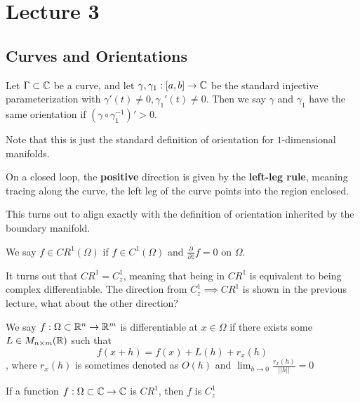 \section{Lecture 3}

\subsection{Curves and Orientations}

\begin{definition}
Let $\Gamma \subset \mathbb{C}$ be a curve, and let $\gamma, \gamma_1: [a, b] \to \mathbb{C}$ be the standard injective parameterization with $\gamma'(t) \neq 0, \gamma_1'(t) \neq 0$. Then we say $\gamma$ and $\gamma_1$ have the same orientation if $(\gamma \circ \gamma_1^{-1})' > 0$.
\end{definition}

Note that this is just the standard definition of orientation for $1$-dimensional manifolds.

On a closed loop, the \textbf{positive} direction is given by the \textbf{left-leg rule}, meaning tracing along the curve, the left leg of the curve points into the region enclosed.

This turns out to align exactly with the definition of orientation inherited by the boundary manifold.

\begin{definition}
We say $f \in CR^1(\Omega)$ if $f \in C^1(\Omega)$ and $\frac{\partial}{\partial \overline{z}} f = 0$ on $\Omega$.
\end{definition}

\begin{remark}
    It turns out that $CR^1 = C^1_z$, meaning that being in $CR^1$ is equivalent to being complex differentiable. The direction from $C^1_z \implies CR^1$ is shown in the previous lecture, what about the other direction?
\end{remark}

\begin{definition}
We say $f: \Omega \subset \mathbb{R}^n \to \mathbb{R}^m$ is differentiable at $x \in \Omega$ if there exists some $L \in M_{n \times m}(\mathbb{R})$ such that
\[f(x + h) = f(x) + L(h) + r_x(h)\]
, where $r_x(h)$ is sometimes denoted as $O(h)$ and $\lim_{h \to 0} \frac{r_x(h)}{||h||} = 0$
\end{definition}

\begin{proposition}
    If a function $f: \Omega \subset \mathbb{C} \to \mathbb{C}$ is $CR^1$, then $f$ is $C_z^1$
\end{proposition}

